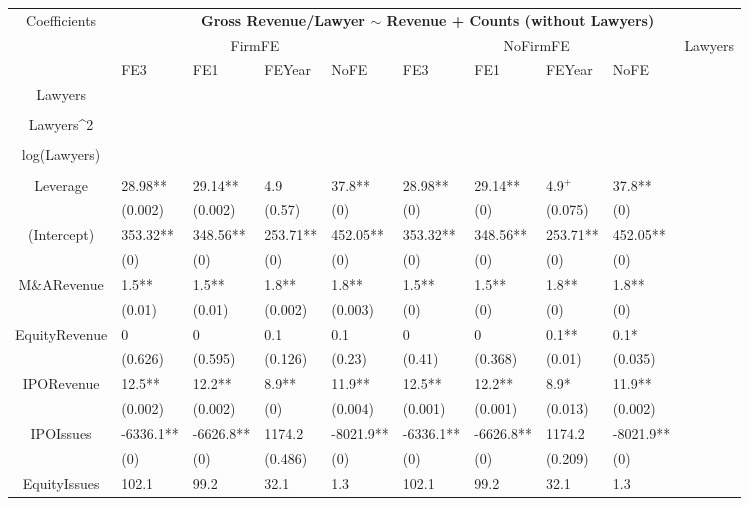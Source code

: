 \documentclass{article}
\begin{document}
\begin{table}[H]
\centering
\begin{tabular}{|clllllllll|}
\hline
\multirow{3}{*}{Coefficients} & \multicolumn{9}{c|}{\textbf{Gross Revenue/Lawyer $\sim$ Revenue + Counts (without Lawyers)}} \\
\cline{2-10}
& \multicolumn{4}{c}{FirmFE} & \multicolumn{4}{c}{NoFirmFE} & \multirow{2}{*}{Lawyers} \\
\cline{2-9}
& FE3 & FE1 & FEYear & NoFE & FE3 & FE1 & FEYear & NoFE &  \\
\hline
 
Lawyers &  &  &  &  &  &  &  &  & \\ 
   &  &  &  &  &  &  &  &  & \\ 
  Lawyers^2 &  &  &  &  &  &  &  &  & \\ 
   &  &  &  &  &  &  &  &  & \\ 
  log(Lawyers) &  &  &  &  &  &  &  &  & \\ 
   &  &  &  &  &  &  &  &  & \\ 
  Leverage & 28.98** & 29.14** & 4.9 & 37.8** & 28.98** & 29.14** & 4.9$^{+}$ & 37.8** & \\ 
   & (0.002) & (0.002) & (0.57) & (0) & (0) & (0) & (0.075) & (0) & \\ 
  (Intercept) & 353.32** & 348.56** & 253.71** & 452.05** & 353.32** & 348.56** & 253.71** & 452.05** & \\ 
   & (0) & (0) & (0) & (0) & (0) & (0) & (0) & (0) & \\ 
  M\&ARevenue & 1.5** & 1.5** & 1.8** & 1.8** & 1.5** & 1.5** & 1.8** & 1.8** & \\ 
   & (0.01) & (0.01) & (0.002) & (0.003) & (0) & (0) & (0) & (0) & \\ 
  EquityRevenue & 0 & 0 & 0.1 & 0.1 & 0 & 0 & 0.1** & 0.1* & \\ 
   & (0.626) & (0.595) & (0.126) & (0.23) & (0.41) & (0.368) & (0.01) & (0.035) & \\ 
  IPORevenue & 12.5** & 12.2** & 8.9** & 11.9** & 12.5** & 12.2** & 8.9* & 11.9** & \\ 
   & (0.002) & (0.002) & (0) & (0.004) & (0.001) & (0.001) & (0.013) & (0.002) & \\ 
  IPOIssues & -6336.1** & -6626.8** & 1174.2 & -8021.9** & -6336.1** & -6626.8** & 1174.2 & -8021.9** & \\ 
   & (0) & (0) & (0.486) & (0) & (0) & (0) & (0.209) & (0) & \\ 
  EquityIssues & 102.1 & 99.2 & 32.1 & 1.3 & 102.1 & 99.2 & 32.1 & 1.3 & \\ 

\end{tabular}
\end{table}
\end{document}
